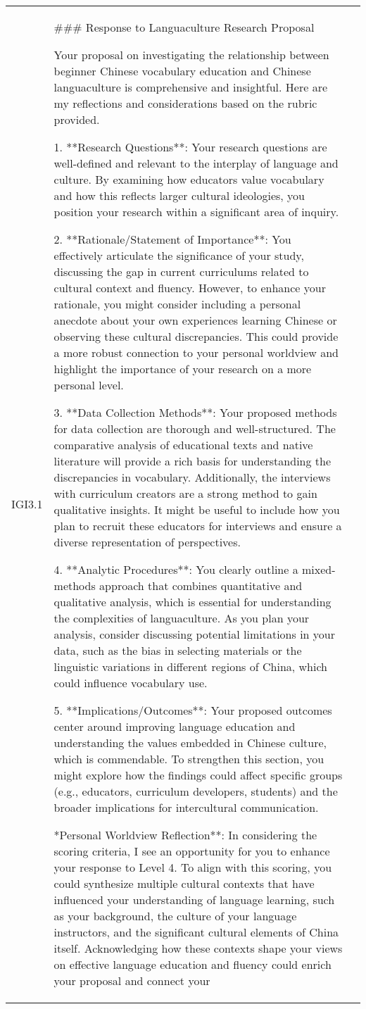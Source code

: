 \begin{center}
\begin{longtable}{|p{}|p{}|p{}|}
\hline
IGI3.1 & \#\#\# Response to Languaculture Research Proposal\par Your proposal on investigating the relationship between beginner Chinese vocabulary education and Chinese languaculture is comprehensive and insightful. Here are my reflections and considerations based on the rubric provided.\par 1. **Research Questions**: Your research questions are well-defined and relevant to the interplay of language and culture. By examining how educators value vocabulary and how this reflects larger cultural ideologies, you position your research within a significant area of inquiry. \par 2. **Rationale/Statement of Importance**: You effectively articulate the significance of your study, discussing the gap in current curriculums related to cultural context and fluency. However, to enhance your rationale, you might consider including a personal anecdote about your own experiences learning Chinese or observing these cultural discrepancies. This could provide a more robust connection to your personal worldview and highlight the importance of your research on a more personal level.\par 3. **Data Collection Methods**: Your proposed methods for data collection are thorough and well-structured. The comparative analysis of educational texts and native literature will provide a rich basis for understanding the discrepancies in vocabulary. Additionally, the interviews with curriculum creators are a strong method to gain qualitative insights. It might be useful to include how you plan to recruit these educators for interviews and ensure a diverse representation of perspectives.\par 4. **Analytic Procedures**: You clearly outline a mixed-methods approach that combines quantitative and qualitative analysis, which is essential for understanding the complexities of languaculture. As you plan your analysis, consider discussing potential limitations in your data, such as the bias in selecting materials or the linguistic variations in different regions of China, which could influence vocabulary use.\par 5. **Implications/Outcomes**: Your proposed outcomes center around improving language education and understanding the values embedded in Chinese culture, which is commendable. To strengthen this section, you might explore how the findings could affect specific groups (e.g., educators, curriculum developers, students) and the broader implications for intercultural communication.\par **Personal Worldview Reflection**: In considering the scoring criteria, I see an opportunity for you to enhance your response to Level 4. To align with this scoring, you could synthesize multiple cultural contexts that have influenced your understanding of language learning, such as your background, the culture of your language instructors, and the significant cultural elements of China itself. Acknowledging how these contexts shape your views on effective language education and fluency could enrich your proposal and connect your 
\end{longtable}
\end{center}
